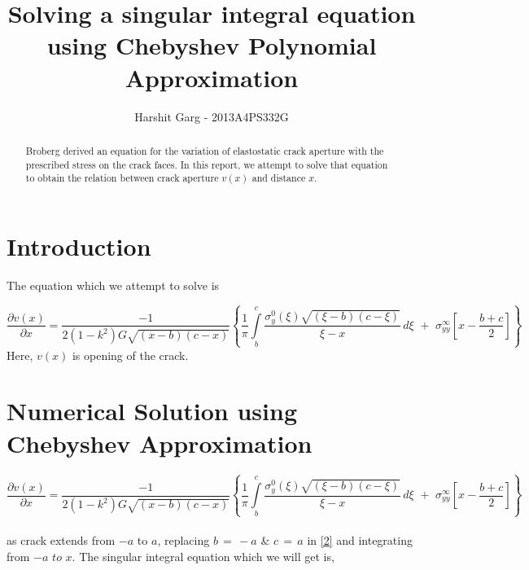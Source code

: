 \documentclass[authoryear,12pt]{elsarticle}
\begin{document}
	\begin{frontmatter}
		\title{Solving a singular integral equation using Chebyshev Polynomial Approximation}
		\begin{abstract}
			Broberg \citep{Broberg199999}  derived an equation for the variation of elastostatic crack aperture with the prescribed stress on the crack faces. In this report, we attempt to solve that equation to obtain the relation between crack aperture \(v(x)\) and distance \(x\).
		\end{abstract}
		
		\author{Harshit Garg - 2013A4PS332G}
		
	\end{frontmatter}
	\section{Introduction}
	
		The equation which we attempt to solve is 
		
		\begin{equation*}
			\frac{\partial v(x)}{\partial x} = \frac{-1}{2(1-k^2)G\sqrt{(x-b)(c-x)}}\left\{ \frac{1}{\pi}\int\limits_{b}^c \frac{\sigma_y^0(\xi)\sqrt{(\xi-b)(c-\xi)}}{\xi-x}\,d\xi \,\,+\,\, \sigma^{\infty}_{yy}[x-\frac{b+c}{2}]\right\}
		\end{equation*}
		Here, \(v(x)\) is opening of the crack.
		
	\section{Numerical Solution using Chebyshev Approximation}
	
		\begin{equation}\label{2}
			\frac{\partial v(x)}{\partial x} = \frac{-1}{2(1-k^2)G\sqrt{(x-b)(c-x)}}\left\{ \frac{1}{\pi}\int\limits_{b}^c \frac{\sigma_y^0(\xi)\sqrt{(\xi-b)(c-\xi)}}{\xi-x}\,d\xi \,\,+\,\, \sigma^{\infty}_{yy}[x-\frac{b+c}{2}]\right\}
		\end{equation}
		\\
		as crack extends from \(-a\) to \(a\), replacing \(b\,=\,-a\) \& \(c\, =\,a \) in \cref{2} and integrating from \( -a\,\, to\,\, x \). The singular integral equation which we will get is,
		
\end{document}
